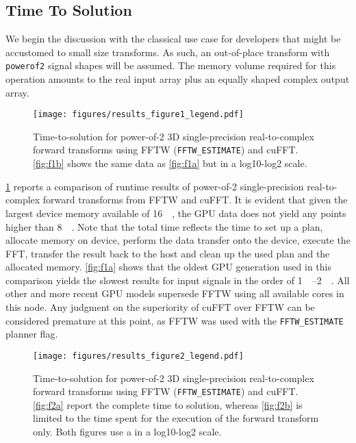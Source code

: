 
\subsection{Time To Solution}
\label{ssec:tts}

We begin the discussion with the classical use case for developers that might be accustomed to small size transforms. As such, an out-of-place transform with \texttt{powerof2} signal shapes will be assumed. The memory volume required for this operation amounts to the real input array plus an equally shaped complex output array.   

\begin{figure}[!tbp]
  \centering
  \texttt{[image: figures/results\_figure1\_legend.pdf]}
  \hfill
  \caption{Time-to-solution for power-of-2 3D single-precision real-to-complex forward transforms using FFTW (\texttt{FFTW\_ESTIMATE}) and cuFFT. \cref{fig:f1b} shows the same data as \cref{fig:f1a} but in a log10-log2 scale.}
  \label{fig:tts}
\end{figure}

\cref{fig:tts} reports a comparison of runtime results of power-of-2 single-precision real-to-complex forward transforms from FFTW and cuFFT. It is evident that given the largest device memory available of  \SI{16}{\gibi\byte}, the GPU data does not yield any points higher than \SI{8}{\gibi\byte}. Note that the total time reflects the time to set up a plan, allocate memory on device, perform the data transfer onto the device, execute the FFT, transfer the result back to the host and clean up the used plan and the allocated memory. \cref{fig:f1a} shows that the oldest GPU generation used in this comparison yields the slowest results for input signals in the order of \SIrange{1}{2}{\gibi\byte}. All other and more recent GPU models supersede FFTW using all available cores in this node. Any judgment on the superiority of cuFFT over FFTW can be considered premature at this point, as FFTW was used with the \texttt{FFTW\_ESTIMATE} planner flag.

\begin{figure}[!tbp]
  \centering
  \texttt{[image: figures/results\_figure2\_legend.pdf]}
  \hfill
  \caption{Time-to-solution for power-of-2 3D single-precision real-to-complex forward transforms using FFTW (\texttt{FFTW\_ESTIMATE}) and cuFFT. \cref{fig:f2a} report the complete time to solution, whereas \cref{fig:f2b} is limited to the time spent for the execution of the forward transform only. Both figures use a in a log10-log2 scale.}
  \label{fig:fftw_plan_flags}
\end{figure}

